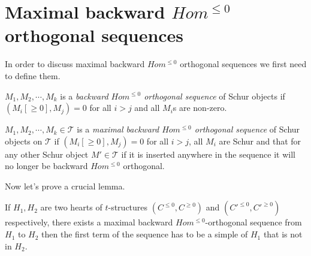 \section{Maximal backward $Hom^{\leq 0}$ orthogonal sequences}
\indent In order to discuss maximal backward $Hom^{\leq 0}$ orthogonal sequences we first need to define them.\\
\begin{definition}
$M_1,M_2,\cdots, M_k$ is a \textit{backward $Hom^{\leq 0}$ orthogonal sequence} of Schur objects if $(M_i[\geq 0], M_j) = 0$ for all $i>j$ and all $M_i$s are non-zero.
\end{definition}
\begin{definition}
$M_1,M_2,\cdots, M_k\in \mathcal{T}$ is a \textit{maximal backward $Hom^{\leq 0}$ orthogonal sequence} of Schur objects on $\mathcal{T}$ if $(M_i[\geq 0], M_j) = 0$ for all $i>j$, all $M_i$ are Schur and that for any other Schur object $M'\in \mathcal{T}$ if it is inserted anywhere in the sequence it will no longer be backward $Hom^{\leq 0}$ orthogonal.
\end{definition}
\indent Now let's prove a crucial lemma.\\
\begin{lemma}\label{lem:C3L1}
If $H_1, H_2$ are two hearts of $t$-structures $(C^{\leq 0}, C^{\geq 0})$ and $(C'^{\leq 0}, C'^{\geq 0})$ respectively, there exists a maximal backward $Hom^{\leq 0}$-orthogonal sequence from $H_1$ to $H_2$ then the first term of the sequence has to be a simple of $H_1$ that is not in $H_2$.
\end{lemma}
